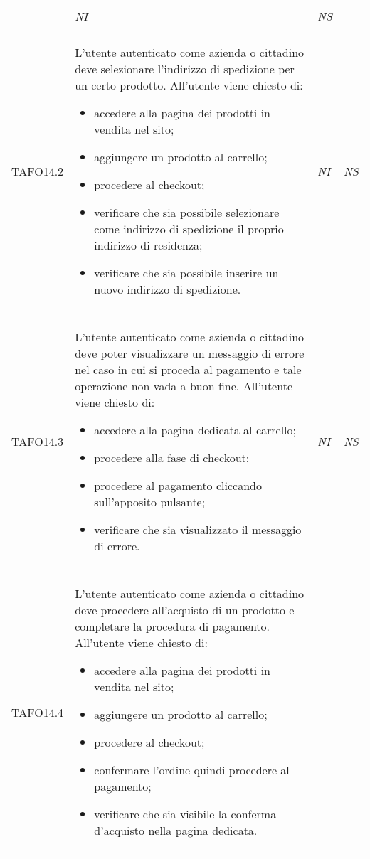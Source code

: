 \begin{longtable}{ >{\centering}p{} >{}p{}
			>{\centering}p{} >{\centering}p{}}
\begin{itemize}
		 \end{itemize} & \textit{NI} & \textit{NS}\\ \tabularnewline
\hypertarget{TAFO14.2}{TAFO14.2} & L'utente autenticato come azienda o cittadino deve selezionare l'indirizzo di
		 spedizione per un certo prodotto. All'utente viene chiesto di:
		 \begin{itemize}
		 	\item accedere alla pagina dei prodotti in vendita nel sito;
		 	\item aggiungere un prodotto al carrello;
		 	\item procedere al checkout;
		 	\item verificare che sia possibile selezionare come indirizzo di
		 	spedizione il proprio indirizzo di residenza;
		 	\item verificare che sia possibile inserire un nuovo indirizzo di
		 	spedizione.
		 \end{itemize} & \textit{NI} & \textit{NS}\\ \tabularnewline
\hypertarget{TAFO14.3}{TAFO14.3} & L'utente autenticato come azienda o cittadino deve poter visualizzare un
		 messaggio di errore nel caso in cui si proceda al pagamento e tale operazione non vada a buon fine. All'utente viene chiesto di:
		 \begin{itemize}
		 	\item accedere alla pagina dedicata al carrello;
		 	\item procedere alla fase di checkout;
		 	\item procedere al pagamento cliccando sull'apposito pulsante;
		 	\item verificare che sia visualizzato il messaggio di errore.
		 \end{itemize} & \textit{NI} & \textit{NS}\\ \tabularnewline
\hypertarget{TAFO14.4}{TAFO14.4}	&	L'utente autenticato come azienda o cittadino deve procedere all'acquisto di un prodotto e completare la procedura di pagamento. All'utente viene chiesto di:
		 \begin{itemize}
		 	\item accedere alla pagina dei prodotti in vendita nel sito;
		 	\item aggiungere un prodotto al carrello;
		 	\item procedere al checkout;
		 	\item confermare l'ordine quindi procedere al pagamento;
		 	\item verificare che sia visibile la conferma d'acquisto nella pagina dedicata.

\end{itemize}
\end{longtable}
